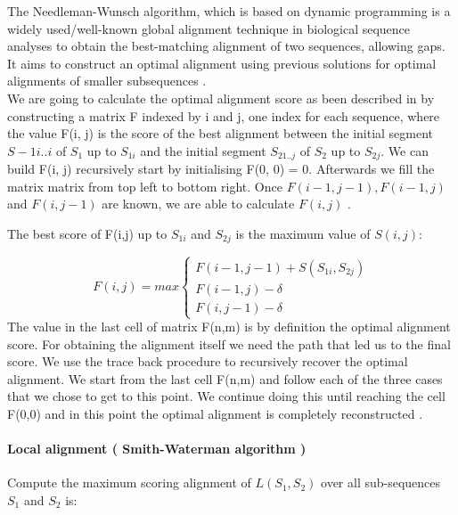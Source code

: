 \documentclass[11pt,a4paper]{report}
\begin{document}
The Needleman-Wunsch algorithm, which is based on dynamic programming 
is a widely used/well-known global alignment technique in biological 
sequence analyses to obtain the best-matching alignment of two sequences, 
allowing  gaps.\\
It aims to construct an optimal alignment using previous solutions for
optimal alignments of smaller subsequences \cite{durbin}.\\
We are going to calculate the optimal alignment score as been described 
in\cite{durbin} by constructing a matrix F indexed
by i and j, one index for each sequence, where the value F(i, j) is the score
of the best alignment between the initial segment $S-{1i..i}$ of $S_{1}$ 
up to $S_{1i}$ and the initial segment $S_{21..j}$ of $S_{2}$  up to 
$S_{2j}$. We can build F(i, j) recursively start by initialising 
F(0, 0) = 0. Afterwards we fill the matrix matrix from top left to 
bottom right. 
Once $ F(i-1, j-1 ), F(i-1 , j) $ and $ F(i , j-1) $ are known, we 
are able to calculate $ F(i, j)$ \cite{durbin}.

The best score of F(i,j) up to $S_{1i}$ and $S_{2j}$ is the maximum 
value of $S(i,j)$:

\[ F(i,j)= max
\begin{cases}
   F(i-1,j-1) + S(S_{1i} , S_{2j})\\
   F(i-1 , j)- \delta\\
   F(i,j-1)- \delta
\end{cases}
\]
The value in the last cell of matrix F(n,m) is by definition the optimal 
alignment score. 
For obtaining the alignment itself we need the path that led us to the 
final score. We use the trace back procedure to recursively recover the 
optimal alignment\cite{durbin}\cite{eddydynamic}.
We start from the last cell F(n,m) and follow each of the three cases 
that we chose to get to this point. We continue doing this until reaching
the cell F(0,0) and in this point the optimal alignment is completely 
reconstructed \cite{eddydynamic}.





\paragraph{ Local alignment ( Smith-Waterman algorithm ) }

Compute the maximum scoring alignment of $L(S_{1}, S_{2})$ over all 
sub-sequences $S_{1}$ and $S_{2}$ is:
\end{document}
